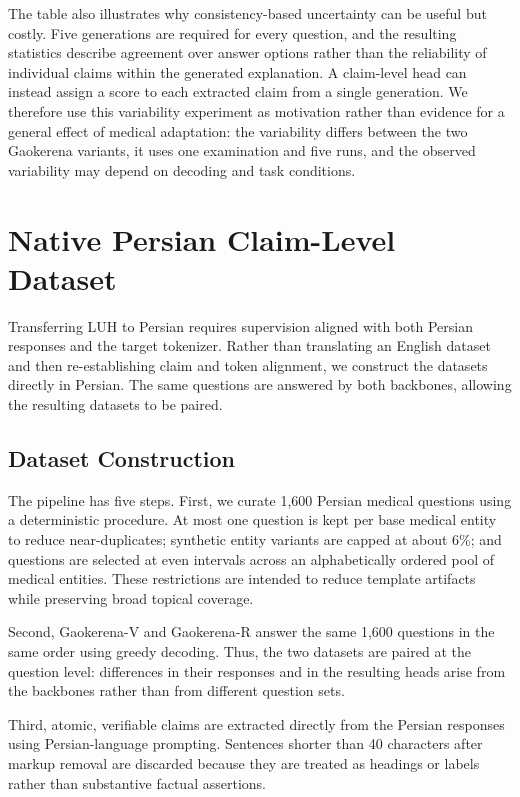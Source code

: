 \documentclass[conference]{IEEEtran}
\begin{document}
The table also illustrates why consistency-based uncertainty can be useful but costly. Five generations are required for every question, and the resulting statistics describe agreement over answer options rather than the reliability of individual claims within the generated explanation. A claim-level head can instead assign a score to each extracted claim from a single generation. We therefore use this variability experiment as motivation rather than evidence for a general effect of medical adaptation: the variability differs between the two Gaokerena variants, it uses one examination and five runs, and the observed variability may depend on decoding and task conditions.

\section{Native Persian Claim-Level Dataset}

Transferring LUH to Persian requires supervision aligned with both Persian responses and the target tokenizer. Rather than translating an English dataset and then re-establishing claim and token alignment, we construct the datasets directly in Persian. The same questions are answered by both backbones, allowing the resulting datasets to be paired.

\subsection{Dataset Construction}

The pipeline has five steps. First, we curate 1,600 Persian medical questions using a deterministic procedure. At most one question is kept per base medical entity to reduce near-duplicates; synthetic entity variants are capped at about 6\%; and questions are selected at even intervals across an alphabetically ordered pool of medical entities. These restrictions are intended to reduce template artifacts while preserving broad topical coverage.

Second, Gaokerena-V and Gaokerena-R answer the same 1,600 questions in the same order using greedy decoding. Thus, the two datasets are paired at the question level: differences in their responses and in the resulting heads arise from the backbones rather than from different question sets.

Third, atomic, verifiable claims are extracted directly from the Persian responses using Persian-language prompting. Sentences shorter than 40 characters after markup removal are discarded because they are treated as headings or labels rather than substantive factual assertions.
\end{document}
